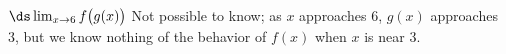 {$\ds \lim_{x\to6}f\big(g(x)\big)$}
{Not possible to know; as $x$ approaches 6, $g(x)$ approaches 3, but we know nothing of the behavior of $f(x)$ when $x$ is near 3.}

